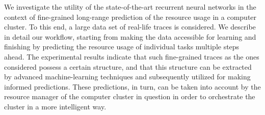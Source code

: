 We investigate the utility of the state-of-the-art recurrent neural networks in
the context of fine-grained long-range prediction of the resource usage in a
computer cluster. To this end, a large data set of real-life traces is
considered. We describe in detail our workflow, starting from making the data
accessible for learning and finishing by predicting the resource usage of
individual tasks multiple steps ahead. The experimental results indicate that
such fine-grained traces as the ones considered possess a certain structure, and
that this structure can be extracted by advanced machine-learning techniques and
subsequently utilized for making informed predictions. These predictions, in
turn, can be taken into account by the resource manager of the computer cluster
in question in order to orchestrate the cluster in a more intelligent way.
